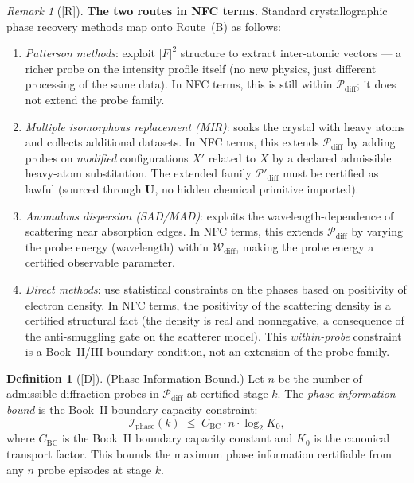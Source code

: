 \documentclass[12pt,oneside]{amsbook}
\theoremstyle{plain}
\theoremstyle{definition}
\newtheorem{definition}[theorem]{Definition}
\theoremstyle{remark}
\newtheorem{remark}[theorem]{Remark}
\newcommand{\status}[1]{\textup{[#1]}}
\begin{document}
\begin{remark}[\status{R}]\label{rem:cryst-phase-routes}
\textbf{The two routes in NFC terms.}
Standard crystallographic phase recovery methods map onto Route~(B)
as follows:
\begin{enumerate}[label=\textup{(\arabic*)}]
  \item \emph{Patterson methods}: exploit $|F|^2$ structure to
    extract inter-atomic vectors --- a richer probe on the
    intensity profile itself (no new physics, just different
    processing of the same data).  In NFC terms, this is still
    within $\mathcal{P}_{\mathrm{diff}}$; it does not extend the
    probe family.
  \item \emph{Multiple isomorphous replacement (MIR)}: soaks the
    crystal with heavy atoms and collects additional datasets.
    In NFC terms, this extends $\mathcal{P}_{\mathrm{diff}}$ by
    adding probes on \emph{modified} configurations $X'$ related
    to $X$ by a declared admissible heavy-atom substitution.  The
    extended family $\mathcal{P}'_{\mathrm{diff}}$ must be certified
    as lawful (sourced through $\mathbf{U}$, no hidden chemical
    primitive imported).
  \item \emph{Anomalous dispersion (SAD/MAD)}: exploits the
    wavelength-dependence of scattering near absorption edges.
    In NFC terms, this extends $\mathcal{P}_{\mathrm{diff}}$ by
    varying the probe energy (wavelength) within $\mathcal{W}_{\mathrm{diff}}$,
    making the probe energy a certified observable parameter.
  \item \emph{Direct methods}: use statistical constraints on the
    phases based on positivity of electron density.  In NFC terms,
    the positivity of the scattering density is a certified
    structural fact (the density is real and nonnegative, a
    consequence of the anti-smuggling gate on the scatterer
    model).  This \emph{within-probe} constraint is a
    Book~II/III boundary condition, not an extension of the probe
    family.
\end{enumerate}
\end{remark}

\begin{definition}[\status{D}]\label{def:cryst-phase-info-bound}
\textup{(Phase Information Bound.)}
Let $n$ be the number of admissible diffraction probes in
$\mathcal{P}_{\mathrm{diff}}$ at certified stage $k$.  The
\emph{phase information bound} is the Book~II boundary capacity
constraint:
\[
  \mathcal{I}_{\mathrm{phase}}(k)
  \;\le\;
  C_{\mathrm{BC}} \cdot n \cdot \log_2 K_0,
\]
where $C_{\mathrm{BC}}$ is the Book~II boundary capacity constant
and $K_0$ is the canonical transport factor.  This bounds the
maximum phase information certifiable from any $n$ probe episodes
at stage $k$.
\end{definition}
\end{document}
